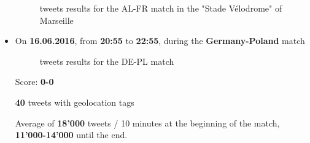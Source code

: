 \documentclass[a4paper,11pt]{report}
\begin{document}
\begin{itemize}
	\begin{figure}[H]
	\vspace{-5pt}
	\begin{center}
	\vspace{-5pt}
	\caption{tweets results for the AL-FR match in the "Stade Vélodrome" of Marseille}
	\end{center}
	\end{figure}
	\vspace{-20pt}
	\newpage
	
	\item On \textbf{16.06.2016}, from \textbf{20:55} to \textbf{22:55}, during the \textbf{Germany-Poland} match
	\begin{figure}[H]
	\vspace{-5pt}
	\begin{center}
	\vspace{-5pt}
	\caption{tweets results for the DE-PL match}
	\end{center}
	\end{figure}
	\vspace{-20pt}
	Score: \textbf{0-0}
	
	\textbf{40} tweets with geolocation tags
	
	Average of \textbf{18'000} tweets / 10 minutes at the beginning of the match, \textbf{11'000-14'000} until the end.
	

\end{itemize}
\end{document}
